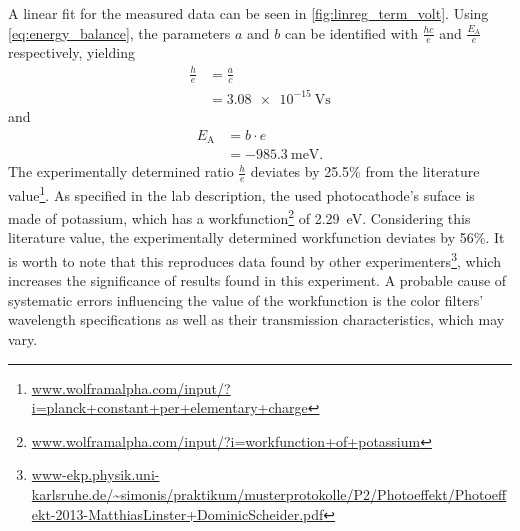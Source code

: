 A linear fit for the measured data can be seen in \autoref{fig:linreg_term_volt}.
Using \autoref{eq:energy_balance}, the parameters $a$ and $b$ can be identified with $\frac{hc}{e}$ and $\frac{E_\text{A}}{e}$ respectively, yielding
\begin{align*}
	\frac{h}{e} &= \frac{a}{c} \\
	&=\SI{3.08e-15}{\volt\second}
\end{align*}
and
\begin{align*}
	E_\text{A} &= b\cdot e \\
	&=\SI{-985.3}{\milli\eV}.
\end{align*}
The experimentally determined ratio $\frac{h}{e}$ deviates by \num{25.5}\% from the literature value\footnote{\url{www.wolframalpha.com/input/?i=planck+constant+per+elementary+charge}}.
As specified in the lab description, the used photocathode's suface is made of potassium, which has a workfunction\footnote{\url{www.wolframalpha.com/input/?i=workfunction+of+potassium}} of \SI{2.29}{\eV}.
Considering this literature value, the experimentally determined workfunction deviates by \num{56}\%.
It is worth to note that this reproduces data found by other experimenters\footnote{\url{www-ekp.physik.uni-karlsruhe.de/~simonis/praktikum/musterprotokolle/P2/Photoeffekt/Photoeffekt-2013-MatthiasLinster+DominicScheider.pdf}}, which increases the significance of results found in this experiment.
A probable cause of systematic errors influencing the value of the workfunction is the color filters' wavelength specifications as well as their transmission characteristics, which may vary.

